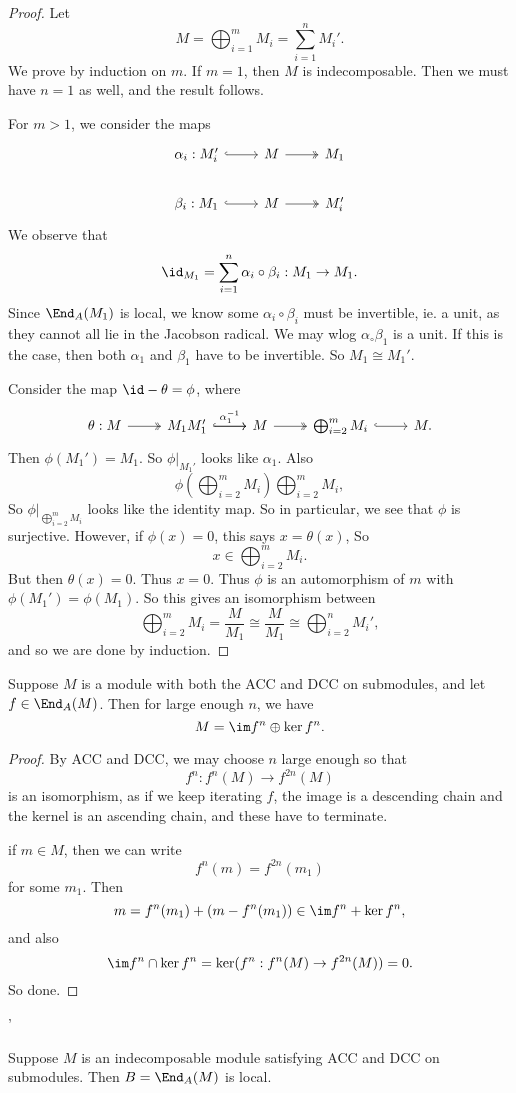 \documentclass[a4paper]{article}
\begin{document}
\begin{proof}
  Let
  \[
    M = \bigoplus_{i = 1}^m M_i = \sum_{i = 1}^n M_i'.
  \]
  We prove by induction on $m$. If $m = 1$, then $M$ is indecomposable. Then we must have $n = 1$ as well, and the result follows.

  For $m > 1$, we consider the maps
  \[
    \begin{tikzcd}
      \alpha_i: M_i' \ar[r, hook] & M \ar[r, two heads] & M_1\\
      \beta_i: M_1 \ar[r, hook] & M \ar[r, two heads] & M_i'
    \end{tikzcd}
  \]
  We observe that
  \[
    \id_{M_1} = \sum_{i = 1}^n \alpha_i \circ \beta_i: M_1 \to M_1.
  \]
  Since $\End_A(M_1)$ is local, we know some $\alpha_i \circ \beta_i$ must be invertible, ie. a unit, as they cannot all lie in the Jacobson radical. We may wlog $\alpha_ \circ \beta_1$ is a unit. If this is the case, then both $\alpha_1$ and $\beta_1$ have to be invertible. So $M_1 \cong M_1'$. %

  Consider the map $\id - \theta = \phi$, where
  \[
    \begin{tikzcd}
      \theta: M \ar[r, two heads] & M_1 \ar[r, "\alpha_1^{-1}"] M_1' \ar[r, hook] & M \ar[r, two heads] & \bigoplus_{i = 2}^m M_i \ar[r, hook] & M.
    \end{tikzcd}
  \]
  Then $\phi(M_1') = M_1$. So $\phi|_{M_1'}$ looks like $\alpha_1$. Also
  \[
    \phi\left(\bigoplus_{i = 2}^m M_i\right) \bigoplus_{i = 2}^m M_i,
  \]
  So $\phi|_{\bigoplus_{i = 2}^m M_i}$ looks like the identity map. So in particular, we see that $\phi$ is surjective. However, if $\phi(x) = 0$, this says $x = \theta(x)$, So
  \[
    x \in \bigoplus_{i = 2}^m M_i.
  \]
  But then $\theta(x) = 0$. Thus $x = 0$. Thus $\phi$ is an automorphism of $m$ with $\phi(M_1') = \phi(M_1)$. So this gives an isomorphism between
  \[
    \bigoplus_{i = 2}^m M_i = \frac{M}{M_1} \cong \frac{M}{M_1} \cong \bigoplus_{i = 2}^n M_i',
  \]
  and so we are done by induction.
\end{proof}

\begin{lemma}[Fitting]
  Suppose $M$ is a module with both the ACC and DCC on submodules, and let $f \in \End_A(M)$. Then for large enough $n$, we have
  \[
    M = \im f^n \oplus \ker f^n.
  \]
\end{lemma}

\begin{proof}
  By ACC and DCC, we may choose $n$ large enough so that
  \[
    f^n: f^n(M) \to f^{2n}(M)
  \]
  is an isomorphism, as if we keep iterating $f$, the image is a descending chain and the kernel is an ascending chain, and these have to terminate.

  if $m \in M$, then we can write
  \[
    f^n(m) = f^{2n}(m_1)
  \]
  for some $m_1$. Then
  \[
    m = f^n(m_1) + (m - f^n(m_1)) \in \im f^n + \ker f^n,
  \]
  and also
  \[
    \im f^n \cap \ker f^n = \ker (f^n: f^n(M) \to f^{2n}(M)) = 0.
  \]
  So done.
\end{proof}
'
\begin{lemma}
  Suppose $M$ is an indecomposable module satisfying ACC and DCC on submodules. Then $B = \End_A(M)$ is local.
\end{lemma}
\end{document}
